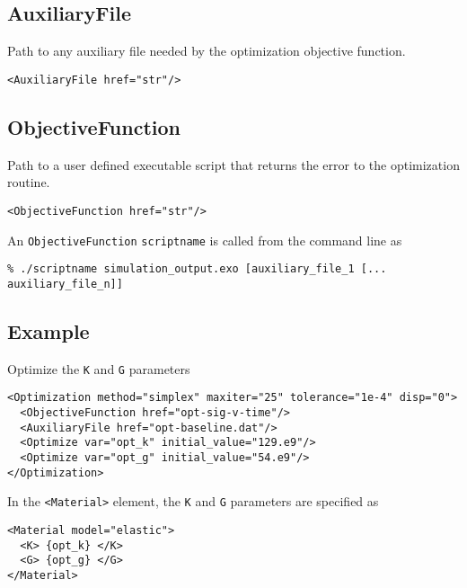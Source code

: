 \documentclass[11pt]{report}
\newcommand{\tag}[1]{\texttt{<#1>}}
\begin{document}
\subsection{AuxiliaryFile}
Path to any auxiliary file needed by the optimization objective function.
\begin{verbatim}
<AuxiliaryFile href="str"/>
\end{verbatim}

\subsection{ObjectiveFunction}
Path to a user defined executable script that returns the error to the
optimization routine.
\begin{verbatim}
<ObjectiveFunction href="str"/>
\end{verbatim}

An \texttt{ObjectiveFunction} \texttt{scriptname} is called from the command
line as
\begin{verbatim}
% ./scriptname simulation_output.exo [auxiliary_file_1 [... auxiliary_file_n]]
\end{verbatim}

\subsection{Example}
Optimize the \texttt{K} and \texttt{G} parameters
\begin{verbatim}
<Optimization method="simplex" maxiter="25" tolerance="1e-4" disp="0">
  <ObjectiveFunction href="opt-sig-v-time"/>
  <AuxiliaryFile href="opt-baseline.dat"/>
  <Optimize var="opt_k" initial_value="129.e9"/>
  <Optimize var="opt_g" initial_value="54.e9"/>
</Optimization>
\end{verbatim}

In the \tag{Material} element, the \texttt{K} and \texttt{G} parameters are
specified as
%
\begin{verbatim}
<Material model="elastic">
  <K> {opt_k} </K>
  <G> {opt_g} </G>
</Material>
\end{verbatim}
\end{document}
